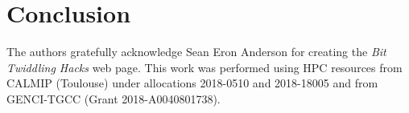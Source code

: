 \documentclass[aip,jcp,reprint,showkeys]{revtex4-1}
\newcommand{\one}{{\texttt{1}}}
\newcommand{\zero}{{\texttt{0}}}
\begin{document}







\section{Conclusion}


\begin{acknowledgments}
The authors gratefully acknowledge Sean Eron Anderson for creating the 
\emph{Bit Twiddling Hacks} web page.
This work was performed using HPC resources from CALMIP (Toulouse) under
allocations 2018-0510 and 2018-18005 and from GENCI-TGCC (Grant
2018-A0040801738).
\end{acknowledgments}



\end{document}
